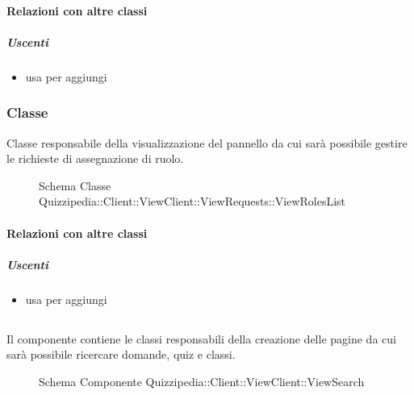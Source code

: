 \paragraph{Relazioni con altre classi}
\subparagraph{Uscenti}
\begin{itemize}
\item usa  per aggiungi
\end{itemize}
\subsubsection{Classe }
Classe responsabile della visualizzazione del pannello da cui sarà possibile gestire le richieste di assegnazione di ruolo.
\begin{figure}[H]
\centering
\noindent{}
\caption[Schema Classe ViewRolesList]{Schema Classe Quizzipedia::Client::ViewClient::ViewRequests::ViewRolesList}
\end{figure}
\paragraph{Relazioni con altre classi}
\subparagraph{Uscenti}
\begin{itemize}
\item usa  per aggiungi
\end{itemize}
\subsection{}
Il componente contiene le classi responsabili della creazione delle pagine da cui sarà possibile ricercare domande, quiz e classi.
\begin{figure}[H]
\centering
\noindent{}
\caption[Schema Componente Quizzipedia::Client::ViewClient::ViewSearch]{Schema Componente Quizzipedia::Client::ViewClient::ViewSearch}
\end{figure}

